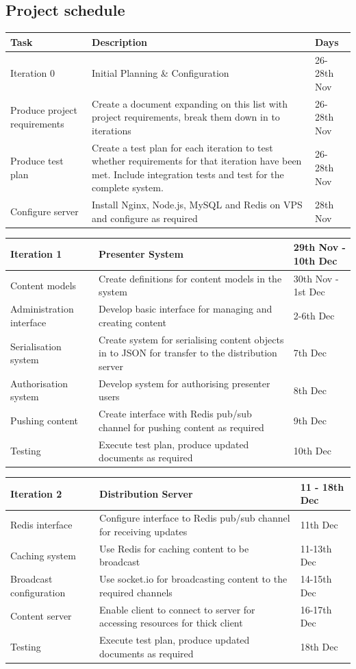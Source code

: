 \documentclass[a4papert,11pt,notitlepage]{article}
\begin{document}
\begin{appendices}
\pagebreak
\appendixpage
\addappheadtotoc
\section{Project schedule}
\label{app:schedule}
\begin{tabular}{p{5cm} p{7cm} p{4cm}}
Task & Description & Days \\
\hline
Iteration 0 & Initial Planning \& Configuration & 26-28th Nov \\
\hline
Produce project requirements & Create a document expanding on this list with project requirements, break them down in to iterations & 26-28th Nov  \\
Produce test plan & Create a test plan for each iteration to test whether requirements for that iteration have been met. Include integration tests and test for the complete system. & 26-28th Nov \\
Configure server & Install Nginx, Node.js, MySQL and Redis on VPS and configure as required & 28th Nov \\
\end{tabular}

\begin{tabular}{p{5cm} p{7cm} p{4cm}}
\hline
Iteration 1 & Presenter System & 29th Nov - 10th Dec \\
\hline
Content models & Create definitions for content models in the system & 30th Nov - 1st Dec \\
Administration interface & Develop basic interface for managing and creating content & 2-6th Dec \\
Serialisation system & Create system for serialising content objects in to JSON for transfer to the distribution server & 7th Dec \\
Authorisation system & Develop system for authorising presenter users & 8th Dec \\
Pushing content & Create interface with Redis pub/sub channel for pushing content as required & 9th Dec \\
Testing & Execute test plan, produce updated documents as required & 10th Dec \\
\end{tabular}

\begin{tabular}{p{5cm} p{7cm} p{4cm}}
\hline
Iteration 2 & Distribution Server & 11 - 18th Dec \\
\hline
Redis interface & Configure interface to Redis pub/sub channel for receiving updates & 11th Dec \\
Caching system & Use Redis for caching content to be broadcast & 11-13th Dec \\
Broadcast configuration & Use socket.io for broadcasting content to the required channels & 14-15th Dec \\
Content server & Enable client to connect to server for accessing resources for thick client & 16-17th Dec \\
Testing & Execute test plan, produce updated documents as required & 18th Dec \\
\end{tabular}


\end{appendices}
\end{document}
